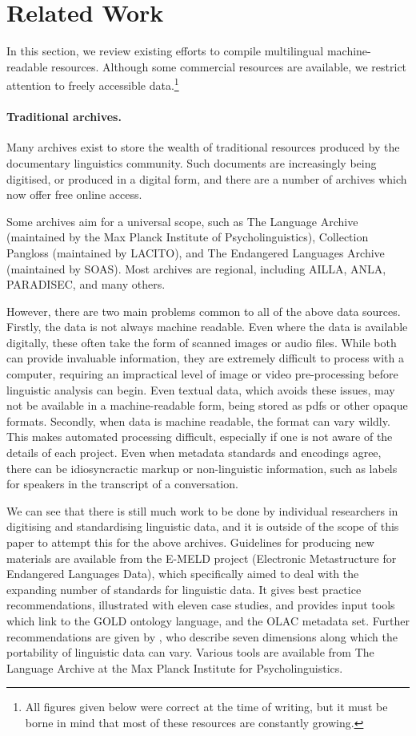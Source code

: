 \section{Related Work} \label{sec:related}

In this section, we review existing efforts to compile multilingual machine-readable resources.  Although some commercial resources are available, we restrict attention to freely accessible data.\footnote{All figures given below were correct at the time of writing, but it must be borne in mind that most of these resources are constantly growing.}

\paragraph{Traditional archives.}
Many archives exist to store the wealth of traditional resources produced by the documentary linguistics community.  Such documents are increasingly being digitised, or produced in a digital form, and there are a number of archives which now offer free online access.

Some archives aim for a universal scope, such as The Language Archive (maintained by the Max Planck Institute of Psycholinguistics), Collection Pangloss (maintained by LACITO), and The Endangered Languages Archive (maintained by SOAS). Most archives are regional, including AILLA, ANLA, PARADISEC, and many others.

However, there are two main problems common to all of the above data sources.  Firstly, the data is not always machine readable.  Even where the data is available digitally, these often take the form of scanned images or audio files.  While both can provide invaluable information, they are extremely difficult to process with a computer, requiring an impractical level of image or video pre-processing before linguistic analysis can begin.  Even textual data, which avoids these issues, may not be available in a machine-readable form, being stored as pdfs or other opaque formats.
Secondly, when data is machine readable, the format can vary wildly.  This makes automated processing difficult, especially if one is not aware of the details of each project.  Even when metadata standards and encodings agree, there can be idiosyncractic markup or non-linguistic information, such as labels for speakers in the transcript of a conversation.

We can see that there is still much work to be done by individual researchers in digitising and standardising linguistic data, and it is outside of the scope of this paper to attempt this for the above archives.  Guidelines for producing new materials are available from the E-MELD project (Electronic Metastructure for Endangered Languages Data), which specifically aimed to deal with the expanding number of standards for linguistic data.  It gives best practice recommendations, illustrated with eleven case studies, and provides input tools which link to the GOLD ontology language, and the OLAC metadata set.  Further recommendations are given by , who describe seven dimensions along which the portability of linguistic data can vary. Various tools are available from The Language Archive at the Max Planck Institute for Psycholinguistics.

